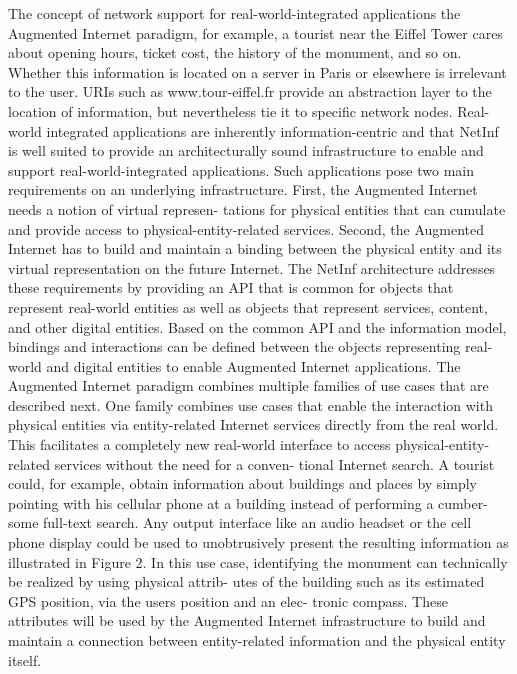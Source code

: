 The concept of network support for real-world-integrated applications the Augmented
Internet paradigm, for example, a tourist near the Eiffel Tower cares about opening hours,
ticket cost, the history of the monument, and so on. Whether this information is located on a
server in Paris or elsewhere is irrelevant to the user. URIs such as www.tour-eiffel.fr provide
an abstraction layer to the location of information, but nevertheless tie it to specific network
nodes.  Real-world integrated applications are inherently information-centric and
that NetInf is well suited to provide an architecturally sound infrastructure to enable and
support real-world-integrated applications. Such applications pose two main requirements on
an underlying infrastructure. First, the Augmented Internet needs a notion of virtual represen-
tations for physical entities that can cumulate and provide access to physical-entity-related
services. Second, the Augmented Internet has to build and maintain a binding between the
physical entity and its virtual representation on the future Internet. The NetInf architecture
addresses these requirements by providing an API that is common for objects that represent
real-world entities as well as objects that represent services, content, and other digital entities.
Based on the common API and the information model, bindings and interactions can be
defined between the objects representing real-world and digital entities to enable Augmented
Internet applications.
The Augmented Internet paradigm combines multiple families of use cases that are described
next. One family combines use cases that enable the interaction with physical entities via
entity-related Internet services directly from the real world. This facilitates a completely new
real-world interface to access physical-entity-related services without the need for a conven-
tional Internet search. A tourist could, for example, obtain information about buildings and
places by simply pointing with his cellular phone at a building instead of performing a cumber-
some full-text search. Any output interface like an audio headset or the cell phone display
could be used to unobtrusively present the resulting information as illustrated in Figure 2. In
this use case, identifying the monument can technically be realized by using physical attrib-
utes of the building such as its estimated GPS position, via the users position and an elec-
tronic compass. These attributes will be used by the Augmented Internet infrastructure to build
and maintain a connection between entity-related information and the physical entity itself.

